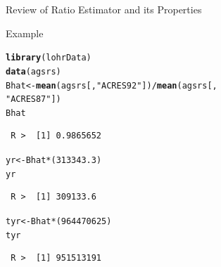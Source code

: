 \documentclass[10pt]{beamer}\usepackage[]{graphicx}\usepackage[]{xcolor}
\makeatletter
\newcommand{\hlnum}[1]{\textcolor[rgb]{0.686,0.059,0.569}{#1}}%
\newcommand{\hlstr}[1]{\textcolor[rgb]{0.192,0.494,0.8}{#1}}%
\newcommand{\hlopt}[1]{\textcolor[rgb]{0,0,0}{#1}}%
\newcommand{\hlstd}[1]{\textcolor[rgb]{0.345,0.345,0.345}{#1}}%
\newcommand{\hlkwb}[1]{\textcolor[rgb]{0.69,0.353,0.396}{#1}}%
\newcommand{\hlkwd}[1]{\textcolor[rgb]{0.737,0.353,0.396}{\textbf{#1}}}%
\newenvironment{kframe}{%
 \def\at@end@of@kframe{}%
 \ifinner\ifhmode%
  \def\at@end@of@kframe{\end{minipage}}%
  \begin{minipage}{\columnwidth}%
 \fi\fi%
 \def\FrameCommand##1{\hskip\@totalleftmargin \hskip-\fboxsep
 \colorbox{shadecolor}{##1}\hskip-\fboxsep
     \hskip-\linewidth \hskip-\@totalleftmargin \hskip\columnwidth}%
 \MakeFramed {\advance\hsize-\width
   \@totalleftmargin\z@ \linewidth\hsize
   \@setminipage}}%
 {\par\unskip\endMakeFramed%
 \at@end@of@kframe}
\newenvironment{knitrout}{}{} %
\makeatother
\begin{document}
\begin{frame}{Review of Ratio Estimator and its Properties}
{}
\end{frame}

\begin{frame}[containsverbatim]{Example}
\small
\begin{knitrout}
\color{fgcolor}\begin{kframe}
\begin{alltt}
\hlkwd{library}\hlstd{(lohrData)}
\hlkwd{data}\hlstd{(agsrs)}
\hlstd{Bhat} \hlkwb{<-} \hlkwd{mean}\hlstd{(agsrs[,} \hlstr{"ACRES92"}\hlstd{])}\hlopt{/}\hlkwd{mean}\hlstd{(agsrs[,}
    \hlstr{"ACRES87"}\hlstd{])}
\hlstd{Bhat}
\end{alltt}
\begin{verbatim}
 R >  [1] 0.9865652
\end{verbatim}
\begin{alltt}
\hlstd{yr} \hlkwb{<-} \hlstd{Bhat} \hlopt{*} \hlstd{(}\hlnum{313343.3}\hlstd{)}
\hlstd{yr}
\end{alltt}
\begin{verbatim}
 R >  [1] 309133.6
\end{verbatim}
\begin{alltt}
\hlstd{tyr} \hlkwb{<-} \hlstd{Bhat} \hlopt{*} \hlstd{(}\hlnum{964470625}\hlstd{)}
\hlstd{tyr}
\end{alltt}
\begin{verbatim}
 R >  [1] 951513191
\end{verbatim}
\end{kframe}
\end{knitrout}
\end{frame}
\end{document}
